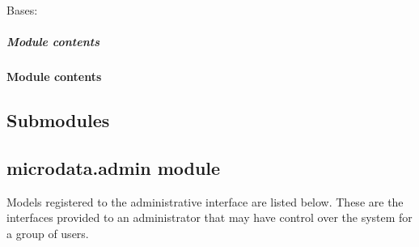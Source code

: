 \documentclass[letterpaper,10pt,english]{sphinxmanual}
\begin{document}
\begin{fulllineitems}
\label{modules/microdata.management.commands:microdata.management.commands.check_glacier_jobs.Command}
Bases: 

\begin{fulllineitems}
\label{modules/microdata.management.commands:microdata.management.commands.check_glacier_jobs.Command.handle}
\end{fulllineitems}


\end{fulllineitems}



\subparagraph{Module contents}
\label{modules/microdata.management.commands:module-microdata.management.commands}\label{modules/microdata.management.commands:module-contents}

\paragraph{Module contents}
\label{modules/microdata.management:module-contents}\label{modules/microdata.management:module-microdata.management}

\subsection{Submodules}
\label{modules/microdata:submodules}

\subsection{microdata.admin module}
\label{modules/microdata:microdata-admin-module}
Models registered to the administrative interface are listed below. These are the interfaces provided to an administrator that may have control over the system for a group of users.
\label{modules/microdata:module-microdata.admin}
\end{document}
